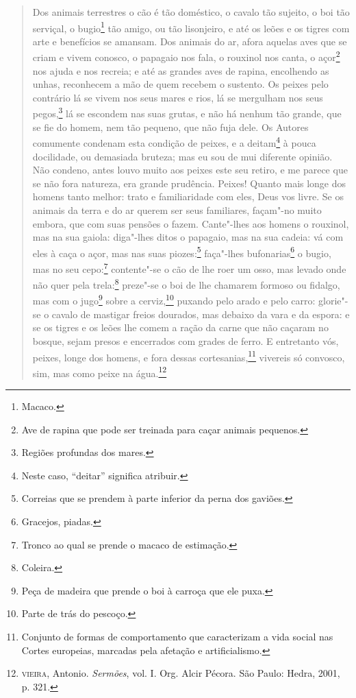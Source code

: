 \begin{quote}
Dos animais terrestres o cão é tão doméstico, o cavalo tão sujeito, o
boi tão serviçal, o bugio\footnote{Macaco.} tão amigo, ou tão
lisonjeiro, e até os leões e os tigres com arte e benefícios se amansam.
Dos animais do ar, afora aquelas aves que se criam e vivem conosco, o
papagaio nos fala, o rouxinol nos canta, o açor\footnote{Ave de rapina
  que pode ser treinada para caçar animais pequenos.} nos ajuda e nos
recreia; e até as grandes aves de rapina, encolhendo as unhas,
reconhecem a mão de quem recebem o sustento. Os peixes pelo contrário lá
se vivem nos seus mares e rios, lá se mergulham nos seus pegos,\footnote{Regiões
  profundas dos mares.} lá se escondem nas suas grutas, e não há nenhum
tão grande, que se fie do homem, nem tão pequeno, que não fuja dele. Os
Autores comumente condenam esta condição de peixes, e a deitam\footnote{Neste
  caso, ``deitar'' significa atribuir.} à pouca docilidade, ou demasiada
bruteza; mas eu sou de mui diferente opinião. Não condeno, antes louvo
muito aos peixes este seu retiro, e me parece que se não fora natureza,
era grande prudência. Peixes! Quanto mais longe dos homens tanto melhor:
trato e familiaridade com eles, Deus vos livre. Se os animais da terra e
do ar querem ser seus familiares, façam"-no muito embora, que com suas
pensões o fazem. Cante"-lhes aos homens o rouxinol, mas na sua gaiola:
diga"-lhes ditos o papagaio, mas na sua cadeia: vá com eles à caça o
açor, mas nas suas piozes:\footnote{Correias que se prendem à parte
  inferior da perna dos gaviões.} faça"-lhes bufonarias\footnote{Gracejos,
  piadas.} o bugio, mas no seu cepo:\footnote{Tronco ao qual se prende o
  macaco de estimação.} contente"-se o cão de lhe roer um osso, mas
levado onde não quer pela trela:\footnote{Coleira.} preze"-se o boi de
lhe chamarem formoso ou fidalgo, mas com o jugo\footnote{Peça de madeira
  que prende o boi à carroça que ele puxa.} sobre a cerviz,\footnote{Parte
  de trás do pescoço.} puxando pelo arado e pelo carro: glorie"-se o
cavalo de mastigar freios dourados, mas debaixo da vara e da espora: e
se os tigres e os leões lhe comem a ração da carne que não caçaram no
bosque, sejam presos e encerrados com grades de ferro. E entretanto vós,
peixes, longe dos homens, e fora dessas cortesanias,\footnote{Conjunto de
  formas de comportamento que caracterizam a vida social nas Cortes
  europeias, marcadas pela afetação e artificialismo.} vivereis só
convosco, sim, mas como peixe na água.\footnote{\textsc{vieira}, Antonio.
  \emph{Sermões}, vol. I. Org. Alcir Pécora. São Paulo: Hedra, 2001, p.
  321.}
\end{quote}

